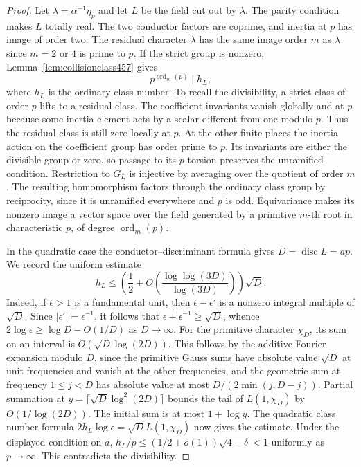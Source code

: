\documentclass[a4paper,11pt]{article}
\theoremstyle{definition}
\theoremstyle{remark}
\numberwithin{equation}{section}
\begin{document}
\begin{proof}
Let \(\lambda=\alpha^{-1}\eta_p\) and let \(L\) be the field
cut out by \(\lambda\). The parity condition makes \(L\) totally
real. The two conductor factors are coprime, and inertia at \(p\)
has image of order two. The residual character \(\bar\lambda\)
has the same image order \(m\) as \(\lambda\) since \(m=2\)
or \(4\) is prime to \(p\). If the strict group is nonzero,
Lemma~\ref{lem:collisionclass457} gives
\[
              p^{\operatorname{ord}_m(p)}\mid h_L ,
\]
where \(h_L\) is the ordinary class number. To recall the
divisibility, a strict class of order \(p\) lifts to a residual
class. The coefficient invariants vanish globally and at \(p\)
because some inertia element acts by a scalar different from
one modulo \(p\). Thus the residual class is still zero locally
at \(p\). At the other finite places the inertia action on the
coefficient group has order prime to \(p\). Its invariants
are either the divisible group or zero, so passage to its
\(p\)-torsion preserves the unramified condition. Restriction
to \(G_L\) is injective by averaging over the quotient of order
\(m\). The resulting homomorphism factors through the ordinary
class group by reciprocity, since it is unramified everywhere
and \(p\) is odd. Equivariance makes its nonzero image a vector
space over the field generated by a primitive \(m\)-th root
in characteristic \(p\), of degree \(\operatorname{ord}_m(p)\).

In the quadratic case the conductor--discriminant formula
gives \(D=\operatorname{disc}L=ap\). We record the uniform
estimate
\[
       h_L\le
       \left(\frac12+
        O\!\left(\frac{\log\log(3D)}{\log(3D)}\right)\right)\sqrt D .
\]
Indeed, if \(\epsilon>1\) is a fundamental unit, then
\(\epsilon-\epsilon'\) is a nonzero integral multiple of
\(\sqrt D\). Since \(|\epsilon'|=\epsilon^{-1}\), it follows
that \(\epsilon+\epsilon^{-1}\ge\sqrt D\), whence
\(2\log\epsilon\ge\log D-O(1/D)\) as \(D\to\infty\).
For the primitive character \(\chi_D\), its sum on an interval
is \(O(\sqrt D\log(2D))\). This follows by the additive Fourier
expansion modulo \(D\), since the primitive Gauss sums have
absolute value \(\sqrt D\) at unit frequencies and vanish at
the other frequencies, and the geometric sum at frequency
\(1\le j<D\) has absolute value at most \(D/(2\min(j,D-j))\).
Partial summation at \(y=\lceil\sqrt D\log^2(2D)\rceil\) bounds
the tail of \(L(1,\chi_D)\) by \(O(1/\log(2D))\).
The initial sum is at most \(1+\log y\). The quadratic
class number formula \(2h_L\log\epsilon=\sqrt D L(1,\chi_D)\)
now gives the estimate. Under the displayed condition on \(a\),
\(h_L/p\le(1/2+o(1))\sqrt{4-\delta}<1\) uniformly as
\(p\to\infty\). This contradicts the divisibility.


\end{proof}
\end{document}
